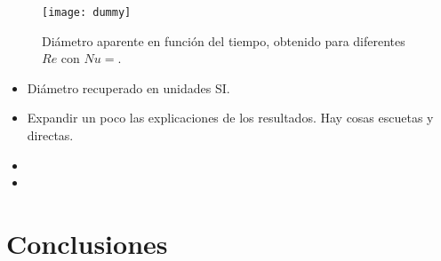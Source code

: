 \begin{figure}[ht]
	\centering
	\texttt{[image: dummy]}
	\caption{Di\'ametro aparente en funci\'on del tiempo, obtenido para diferentes $Re$ con $Nu=$.}
	\label{fig:d_vs_t_Re}
\end{figure}
\FloatBarrier

\begin{itemize}
	\item Di\'ametro recuperado en unidades SI.
	\item Expandir un poco las explicaciones de los resultados. Hay cosas escuetas y directas.
	\item {}
	\item {}
\end{itemize}

\section{Conclusiones}